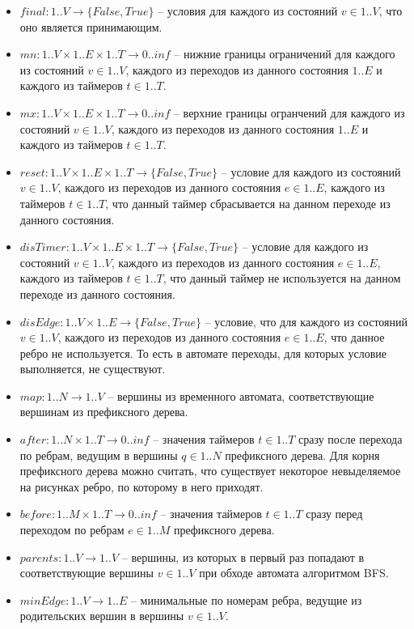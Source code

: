 \documentclass[times,specification,annotation]{itmo-student-thesis}
\begin{document}
\begin{itemize}
  \item $final: 1..V \rightarrow \{ False, True \}$ -- условия для каждого из состояний $v \in 1..V$, что оно является принимающим.
  \item $mn: 1..V \times 1..E \times 1..T \rightarrow 0..inf$ -- нижние границы ограничений для каждого из состояний $v \in 1..V$, каждого из переходов из данного состояния $1..E$ и каждого из
    таймеров $t \in 1..T$.
  \item $mx: 1..V \times 1..E \times 1..T \rightarrow 0..inf$ -- верхние границы огранчений для каждого из состояний $v \in 1..V$, каждого из переходов из данного состояния $1..E$ и каждого из
    таймеров $t \in 1..T$.
  \item $reset: 1..V \times 1..E \times 1..T \rightarrow \{ False, True \}$ -- условие для каждого из состояний $v \in 1..V$, каждого из переходов из данного состояния $e \in 1..E$,
    каждого из таймеров $t \in 1..T$, что данный таймер сбрасывается на данном переходе из данного состояния.
  \item $disTimer: 1..V \times 1..E \times 1..T \rightarrow \{ False, True \}$ -- условие для каждого из состояний $v \in 1..V$, каждого из переходов из данного состояния $e \in 1..E$,
    каждого из таймеров $t \in 1..T$, что данный таймер не используется на данном переходе из данного состояния. 
  \item $disEdge: 1..V \times 1..E \rightarrow \{ False, True \}$ -- условие, что для каждого из состояний $v \in 1..V$, каждого из переходов из данного состояния $e \in 1..E$,
    что данное ребро не используется. То есть в автомате переходы, для которых условие выполняется, не существуют.
  \item $map: 1..N \rightarrow 1..V$ -- вершины из временного автомата, соответствующие вершинам из префиксного дерева.
  \item $after: 1..N \times 1..T \rightarrow 0..inf$ -- значения таймеров $t \in 1..T$ сразу после перехода по ребрам, ведущим в вершины $q \in 1..N$ префиксного дерева. Для корня префиксного
    дерева можно считать, что существует некоторое невыделяемое на рисунках ребро, по которому в него приходят.
  \item $before: 1..M \times 1..T \rightarrow 0..inf$ -- значения таймеров $t \in 1..T$ сразу перед переходом по ребрам $e \in 1..M$ префиксного дерева.
  \item $parents: 1..V \rightarrow 1..V$ -- вершины, из которых в первый раз попадают в соответствующие вершины $v \in 1..V$ при обходе автомата алгоритмом BFS.
  \item $minEdge: 1..V \rightarrow 1..E$ -- минимальные по номерам ребра, ведущие из родительских вершин в вершины $v \in 1..V$.
\end{itemize}
\end{document}
